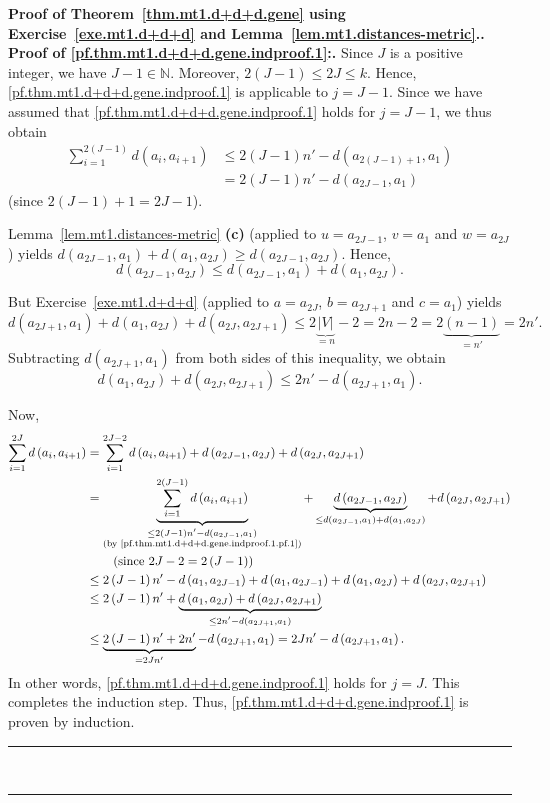\documentclass[numbers=enddot,12pt,final,onecolumn,notitlepage]{scrartcl}%
\theoremstyle{definition}
\newenvironment{proof}[1][Proof]{\noindent\textbf{#1.} }{\ \rule{0.5em}{0.5em}}
\let\sumnonlimits\sum
\renewcommand{\sum}{\sumnonlimits\limits}
\newcommand{\NN}{\mathbb{N}}
\newcommand{\abs}[1]{\left| #1 \right|}
\newcommand{\tup}[1]{\left( #1 \right)}
\newcommand{\underbrack}[2]{\underbrace{#1}_{\substack{#2}}}
\begin{document}
\begin{proof}[Proof of Theorem~\ref{thm.mt1.d+d+d.gene} using
Exercise~\ref{exe.mt1.d+d+d} and
Lemma~\ref{lem.mt1.distances-metric}.]
\begin{proof}[Proof of \eqref{pf.thm.mt1.d+d+d.gene.indproof.1}:]
Since $J$ is a positive integer, we have $J-1 \in \NN$. Moreover,
$2 \tup{J-1} \leq 2J \leq k$. Hence,
\eqref{pf.thm.mt1.d+d+d.gene.indproof.1} is applicable to $j = J-1$.
Since we have assumed that \eqref{pf.thm.mt1.d+d+d.gene.indproof.1}
holds for $j = J-1$, we thus obtain
\begin{align}
\sum_{i=1}^{2 \tup{J-1}} d \tup{a_i, a_{i+1}}
&\leq 2\tup{J-1} n' - d \tup{a_{2\tup{J-1}+1}, a_1} \nonumber \\
&= 2\tup{J-1} n' - d \tup{a_{2J-1}, a_1}
\label{pf.thm.mt1.d+d+d.gene.indproof.1.pf.1}
\end{align}
(since $2\tup{J-1}+1 = 2J-1$).

Lemma~\ref{lem.mt1.distances-metric} \textbf{(c)} (applied to
$u = a_{2J-1}$, $v = a_1$ and $w = a_{2J}$) yields
$d \tup{a_{2J-1}, a_1} + d \tup{a_1, a_{2J}}
\geq d \tup{a_{2J-1}, a_{2J}}$.
Hence,
\[
d \tup{a_{2J-1}, a_{2J}}
\leq d \tup{a_{2J-1}, a_1} + d \tup{a_1, a_{2J}} .
\]

But Exercise~\ref{exe.mt1.d+d+d} (applied to $a = a_{2J}$,
$b = a_{2J+1}$ and $c = a_1$) yields
\[
d \tup{a_{2J+1}, a_1} + d \tup{a_1, a_{2J}} + d \tup{a_{2J}, a_{2J+1}}
\leq 2 \underbrace{\abs{V}}_{= n} - 2 = 2 n - 2
= 2 \underbrace{\tup{n-1}}_{= n'} = 2 n' .
\]
Subtracting $d \tup{a_{2J+1}, a_1}$ from both sides of this
inequality, we obtain
\[
d \tup{a_1, a_{2J}} + d \tup{a_{2J}, a_{2J+1}}
\leq 2 n' - d \tup{a_{2J+1}, a_1} .
\]

Now,
\begin{align*}
\sum_{i=1}^{2J} d \tup{a_i, a_{i+1}}
&= \sum_{i=1}^{2J-2} d \tup{a_i, a_{i+1}}
        + d \tup{a_{2J-1}, a_{2J}} + d \tup{a_{2J}, a_{2J+1}} \\
&= \underbrack{\sum_{i=1}^{2 \tup{J-1}} d \tup{a_i, a_{i+1}}}
              {\leq 2\tup{J-1} n' - d \tup{a_{2J-1}, a_1} \\
               \text{(by \eqref{pf.thm.mt1.d+d+d.gene.indproof.1.pf.1})}}
        + \underbrack{d \tup{a_{2J-1}, a_{2J}}}
                     {\leq d \tup{a_{2J-1}, a_1} + d \tup{a_1, a_{2J}}}
        + d \tup{a_{2J}, a_{2J+1}} \\
&\qquad \left(\text{since } 2J-2 = 2 \tup{J-1} \right) \\
&\leq 2\tup{J-1} n' - d \tup{a_1, a_{2J-1}}
        + d \tup{a_1, a_{2J-1}} + d \tup{a_1, a_{2J}}
        + d \tup{a_{2J}, a_{2J+1}} \\
&\leq 2\tup{J-1} n'
        + \underbrack{d \tup{a_1, a_{2J}} + d \tup{a_{2J}, a_{2J+1}}}
                     {\leq 2 n' - d \tup{a_{2J+1}, a_1} } \\
&\leq \underbrace{2\tup{J-1} n' + 2n'}_{= 2J n'}
      - d \tup{a_{2J+1}, a_1}
 = 2J n' - d \tup{a_{2J+1}, a_1} .
\end{align*}
In other words, \eqref{pf.thm.mt1.d+d+d.gene.indproof.1} holds
for $j = J$.
This completes the induction step.
Thus, \eqref{pf.thm.mt1.d+d+d.gene.indproof.1} is proven by induction.
\end{proof}


\end{proof}
\end{document}
